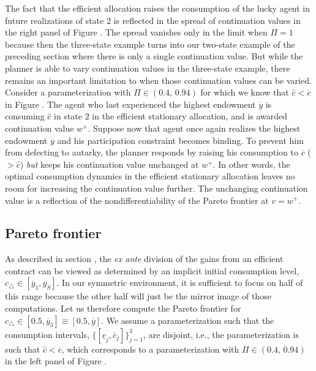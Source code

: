 The fact that the efficient allocation raises the consumption of
the lucky agent in future realizations of state 2 is reflected in
the
spread of continuation values in the right panel of Figure %
. The spread vanishes only in the limit when $\Pi=1$
because then the three-state example turns into our two-state
example of the preceding section where there is only a single
continuation value. But while the planner is able to vary
continuation values in the three-state example, there remains an
important limitation to when those continuation values can be
varied. Consider a parameterization with $\Pi\in(0.4,\, 0.94)$ for
which we know that $\hat c < \overline c$ in  Figure
. The agent who last experienced the highest
endowment $\overline y$ is consuming $\hat c$ in state 2 in the
efficient stationary allocation, and is awarded continuation value
$w^+$. Suppose now that agent  once again realizes the highest
endowment $\overline y$ and his participation constraint becomes
binding. To prevent him from defecting to autarky, the planner
responds by raising his consumption to $\overline c$ ($> \hat c$)
{\it but\/} keeps his continuation value unchanged at $w^+$. In
other words, the optimal consumption dynamics in the efficient
stationary allocation leaves no room for increasing the
continuation value  further.
The unchanging continuation value is a reflection of the
nondifferentiability of the Pareto frontier at $v=w^+$.


\subsection{Pareto frontier}
As described in section ,
the {\it ex ante} division of the gains from
an efficient contract can be viewed as determined by an implicit
initial  consumption level, $c_{\triangle}\in[\overline y_1,
\overline y_S]$. In our symmetric environment, it is
sufficient to focus on half of this range because the other half
will just be the mirror image of those computations. Let us
therefore compute the Pareto frontier for $c_{\triangle}\in[0.5,
\overline y_3]\equiv[0.5, \overline y]$. We assume a
parameterization such that the consumption intervals,
$\{[\underline c_j, \overline c_j]\}_{j=1}^3$, are disjoint, i.e.,
the parameterization is such that $\hat c < \overline c$, which
corresponds to a parameterization with $\Pi\in(0.4,\, 0.94)$
in the left panel of Figure %
.

